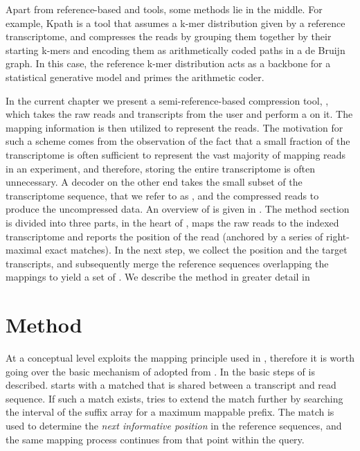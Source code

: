 Apart from reference-based and \denovo tools, some methods lie in the middle.  For example, Kpath \citep{Kingsford2015} is a tool that assumes a k-mer distribution given by a reference transcriptome, and compresses the reads by grouping them together by their starting k-mers and encoding them as arithmetically coded paths in a de Bruijn graph.  In this case, the reference k-mer distribution acts as a backbone for a statistical generative model and primes the arithmetic coder.

In the current chapter we present a semi-reference-based compression tool, \quark, which takes the raw reads and transcripts from the user and perform a \qm on it. The mapping information is then utilized to represent the reads. The motivation for such a scheme comes from the observation of the fact that a small fraction of the transcriptome is often sufficient to represent the vast majority of mapping reads in an experiment, and therefore, storing the entire transcriptome is often unnecessary. A decoder on the other end takes the small subset of the transcriptome sequence, that we refer to as \iss, and the compressed reads to produce the uncompressed data. An overview of \quark is given in . The method section is divided into three parts, in the heart of \quark, \qm maps the raw reads to the indexed transcriptome and reports the position of the read (anchored by a series of right-maximal exact matches). In the next step, we collect the position and the target transcripts, and subsequently merge the reference sequences overlapping the mappings to yield a set of \iss. We describe the method in greater detail in 

\section{Method}\label{sec:quark_method}
At a conceptual level \quark exploits the mapping principle used in \qm, therefore it is worth going over the basic mechanism of \qm adopted from \citet{rapmap}. In  the basic steps of \qm is described. \Qm starts with a matched \kmer that is shared between a transcript and read sequence. If such a match exists, \qm tries to extend the match further by searching the interval of the suffix array for a maximum mappable prefix. The match is used to determine the \textit{next informative position} in the reference sequences, and the same mapping process continues from that point within the query.


